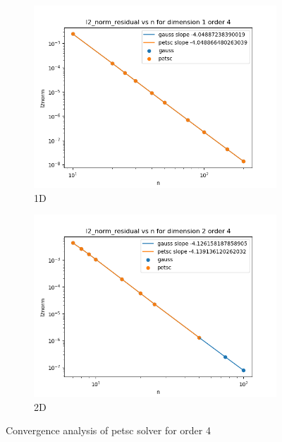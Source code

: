 \documentclass[12 pt, final]{article}
\begin{document}
\begin{itemize}
\begin{figure}[H]
        \label{fig:test}
        \end{figure}
       \begin{figure}[H]
        \centering
        \begin{subfigure}{.5\textwidth}
          \centering
          \includegraphics[width=.99\linewidth]{figures/l2norm_petsc_gauss_order_4_dimension_1.png}
          \caption{1D}
          \label{fig:sub1}
        \end{subfigure}%
        \begin{subfigure}{.5\textwidth}
          \centering
          \includegraphics[width=.99\linewidth]{figures/l2norm_petsc_gauss_order_4_dimension_2.png}
          \caption{2D}
          \label{fig:sub2}
        \end{subfigure}
        \caption{Convergence analysis of petsc solver for order 4}
        \label{fig:test}
        \end{figure}
        

\end{itemize}
\end{document}
